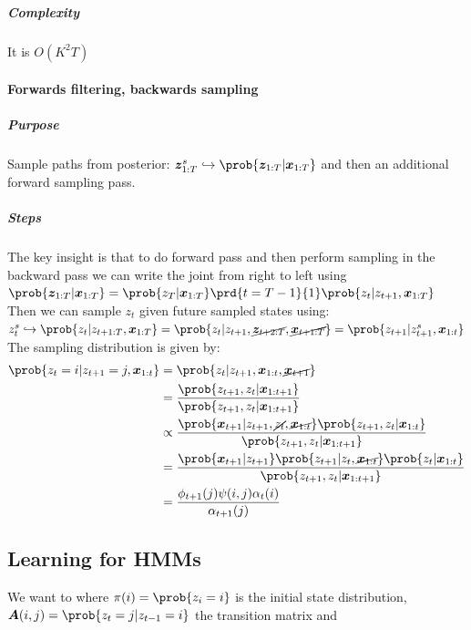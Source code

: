 \subparagraph{Complexity}
It is $O(K^{2}T)$

\paragraph{Forwards filtering, backwards sampling}
\subparagraph{Purpose}
Sample paths from posterior: $\bm{z}^{s}_{1:T} \hookrightarrow \prob{\bm{z}_{1:T}|\bm{x}_{1:T}}$
 and then an additional 
forward sampling pass.
\subparagraph{Steps}
The key insight is that to do forward pass and then perform sampling in the backward pass we can
write the joint from right to left using
$\prob{\bm{z}_{1:T}|\bm{x}_{1:T}} = \prob{z_{T}|\bm{x}_{1:T}
}\prd{t=T-1}{1}\prob{z_{t}|z_{t+1},\bm{x}_{1:T}}$\\
Then we can sample $z_{t}$ given future sampled states using:\\
$z^{s}_{t} \hookrightarrow\prob{z_{t}|z_{t+1:T},\bm{x}_{1:T}} = \prob{z_{t}|z_{t+1},\cancel{\bm{z}_{
t+2:T}}, \cancel{\bm{x}_{t+1:T}}} =  \prob{z_{t+1}|z_{t+1}^{s},\bm{x}_{1:t}}$\\

The sampling distribution is given by:
\begin{align*}
    \prob{z_{t}=i|z_{t+1}=j,\bm{x}_{1:t}}
    &= \prob{z_{t}|z_{t+1},\bm{x}_{1:t},\cancel{\bm{x}_{t+1}}}\\
    &= \dfrac{\prob{z_{t+1},z_{t}|\bm{x}_{1:t+1}}}{\prob{z_{t+1},z_{t}|\bm{x}_{1:t+1}}}\\
    &\propto \dfrac{\prob{\bm{x}_{t+1}|z_{t+1},\cancel{z_{t}},\cancel{\bm{x}_{1:t}}}\prob{z_{t+1},
            z_{t}|\bm{x}_{1:t}}}{\prob{z_{t+1},z_{t}|\bm{x}_{1:t+1}}}\\
    &= \dfrac{\prob{\bm{x}_{t+1}|z_{t+1}}\prob{z_{t+1}|z_{t},\cancel{\bm{x}_{1:t}}}\prob{z_{t}|
    \bm{x}_{1:t}}}{\prob{z_{t+1},z_{t}|\bm{x}_{1:t+1}}}\\
    &= \dfrac{\phi_{t+1}(j)\psi(i,j)\alpha_{t}(i)}{\alpha_{t+1}(j)}
\end{align*}

\subsection{Learning for HMMs}
We want to  where $\pi(i)=\prob{
z_{i}=i}$ is the initial state distribution, $\bm{A}(i,j)=\prob{z_{t}=j|z_{t-1}=i}$ the transition
matrix and 
